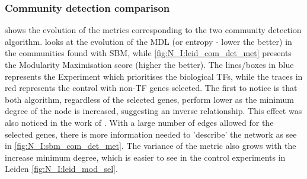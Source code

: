 \subsubsection{Community detection comparison}

 shows the evolution of the metrics corresponding to the two community detection algorithm.  looks at the evolution of the MDL (or entropy - lower the better) in the communities found with SBM, while \cref{fig:N_I:leid_com_det_met} presents the Modularity Maximisation score (higher the better). The lines/boxes in blue represents the Experiment which prioritises the biological TFs, while the traces in red represents the control with non-TF genes selected. The first to notice is that both algorithm, regardless of the selected genes, perform lower as the minimum degree of the node is increased, suggesting an inverse relationship. This effect was also noticed in the work of \citet{Care2019-ij}. With a large number of edges allowed for the selected genes, there is more information needed to 'describe' the network as see in \cref{fig:N_I:sbm_com_det_met}. The variance of the metric also grows with the increase minimum degree, which is easier to see in the control experiments in Leiden \cref{fig:N_I:leid_mod_sel}.


